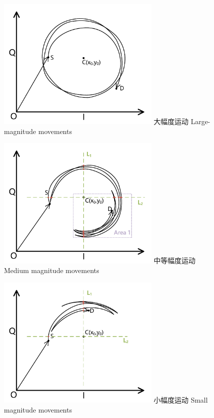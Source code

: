\begin{figure}[!htp]
  \centering
  \includegraphics[width=0.7\textwidth]{figure/large-magnitude-movement.pdf}
  \bicaption
    {大幅度运动}
    {Large-magnitude movements}
  \label{fig:large-magnitude-movements}
\end{figure}

\begin{figure}[!htp]
  \centering
  \includegraphics[width=0.7\textwidth]{figure/medium-magnitude-movement.pdf}
  \bicaption
    {中等幅度运动}
    {Medium magnitude movements}
  \label{fig:medium-magnitude-movements}
\end{figure}

\begin{figure}[!htp]
  \centering
  \includegraphics[width=0.7\textwidth]{figure/small-magnitude-movement.pdf}
  \bicaption
    {小幅度运动}
    {Small magnitude movements}
  \label{fig:small-magnitude-movements}
\end{figure}

